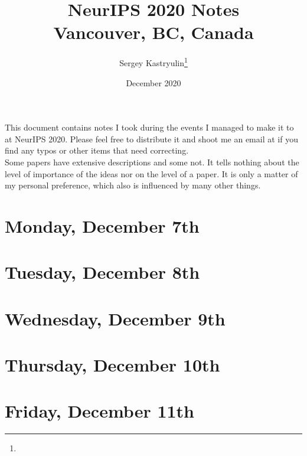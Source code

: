 \documentclass[11pt]{article}
\title{NeurIPS 2020 Notes \\ \Large{Vancouver, BC, Canada}}
\author{Sergey Kastryulin\footnote{\durl{https://github.com/snk4tr}} \\ \durl{snk4tr@gmail.com}}
\date{December 2020}
\begin{document}
\maketitle
\tableofcontents
\newpage


This document contains notes I took during the events I managed to make it to at NeurIPS 2020. Please feel free to distribute it and shoot me an email at  if you find any typos or other items that need correcting. \\

Some papers have extensive descriptions and some not. 
It tells nothing about the level of importance of the ideas nor on the level of a paper. 
It is only a matter of my personal preference, which also is influenced by many other things.



\newpage
\section{Monday, December 7th}


\newpage
\section{Tuesday, December 8th}


\newpage
\section{Wednesday, December 9th}


\newpage
\section{Thursday, December 10th}


\newpage
\section{Friday, December 11th}

\end{document}
